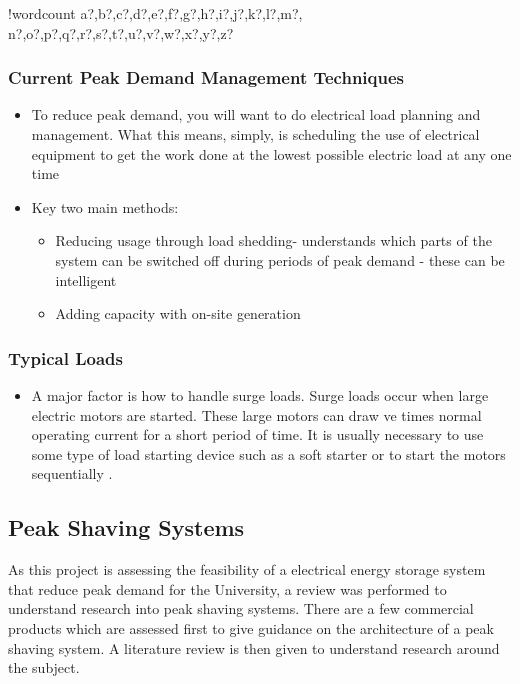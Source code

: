 \documentclass[10pt]{article}
\providecommand{\tightlist}{%
  \setlength{\itemsep}{0pt}\setlength{\parskip}{0pt}}
\newcounter{words}
\newenvironment{counted}{%
  \setcounter{words}{0}
  \SearchList!{wordcount}{\stepcounter{words}}
    {a?,b?,c?,d?,e?,f?,g?,h?,i?,j?,k?,l?,m?,
    n?,o?,p?,q?,r?,s?,t?,u?,v?,w?,x?,y?,z?}
  \UndoBoundary{'}
  \SearchOrder{p;}}{%
  \StopSearching}
\begin{document}
\begin{counted}
\subsubsection{Current Peak Demand Management
Techniques}\label{current-peak-demand-management-techniques}

\begin{itemize}
\tightlist
\item
  To reduce peak demand, you will want to do electrical load planning
  and management. What this means, simply, is scheduling the use of
  electrical equipment to get the work done at the lowest possible
  electric load at any one time \cite{Reducing37:online}
\item
  Key two main methods:

  \begin{itemize}
  \tightlist
  \item
    Reducing usage through load shedding- understands which parts of the
    system can be switched off during periods of peak demand - these can
    be intelligent \cite{6199851}
  \item
    Adding capacity with on-site generation \cite{schneiderRECPS}
  \end{itemize}
\end{itemize}

\subsubsection{Typical Loads}\label{typical-loads}

\begin{itemize}
\tightlist
\item
  A major factor is how to handle surge loads. Surge loads occur when
  large electric motors are started. These large motors can draw ve
  times normal operating current for a short period of time. It is
  usually necessary to use some type of load starting device such as a
  soft starter or to start the motors sequentially \cite{baldorPS}.
\end{itemize}

\subsection{Peak Shaving Systems}\label{peak-shaving-systems}

As this project is assessing the feasibility of a electrical energy
storage system that reduce peak demand for the University, a review was
performed to understand research into peak shaving systems. There are a
few commercial products which are assessed first to give guidance on the
architecture of a peak shaving system. A literature review is then given
to understand research around the subject.


\end{counted}
\end{document}
